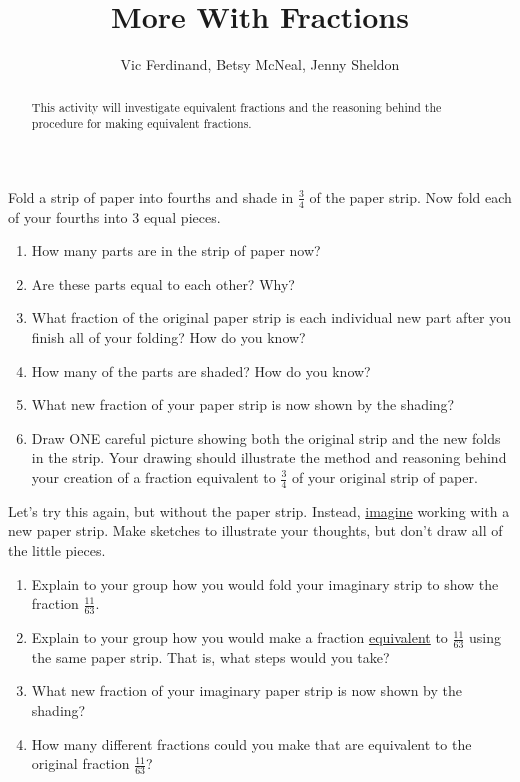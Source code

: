 \documentclass{ximera}
\title{More With Fractions}
\author{Vic Ferdinand, Betsy McNeal, Jenny Sheldon}
\begin{document}
\begin{abstract}
 This activity will investigate equivalent fractions and the reasoning behind the procedure for making equivalent fractions. %
\end{abstract}
\maketitle



\begin{problem} \label{MoreWithFractions1}
Fold a strip of paper into fourths and shade in $\frac{3}{4}$ of the paper strip. Now fold each of your fourths into 3 equal pieces.  
\begin{enumerate}
    \item   How many parts are in the strip of paper now?
    \item   Are these parts equal to each other?  Why?
    \item   What fraction of the original paper strip is each individual new part after you finish all of your folding? How do you know?
    \item   How many of the parts are shaded?  How do you know?
    \item   What new fraction of your paper strip is now shown by the shading?  
    \item Draw ONE careful picture showing both the original strip and the new folds in the strip.  Your drawing should illustrate the method and reasoning behind your creation of a fraction equivalent to $\frac{3}{4}$ of your original strip of paper.
   
\end{enumerate}
\end{problem}

\pagebreak

\begin{problem} \label{MoreWithFractions2}
 Let's try this again, but without the paper strip.  Instead, \underline{imagine} working with a new paper strip. Make sketches to illustrate your thoughts, but don't draw all of the little pieces.  
\begin{enumerate}
    \item Explain to your group how you would fold your imaginary strip to show the fraction $\frac{11}{63}$.   
    \item Explain to your group how you would make a fraction  \underline{equivalent} to $\frac{11}{63}$ using the same paper strip.  That is, what steps would you take?
   
    \item   What new fraction of your imaginary paper strip is now shown by the shading?  
    
    \item How many different fractions could you make that are equivalent to the original fraction $\frac{11}{63}$?
   
\end{enumerate}
\end{problem}
\vskip 1in
\end{document}
